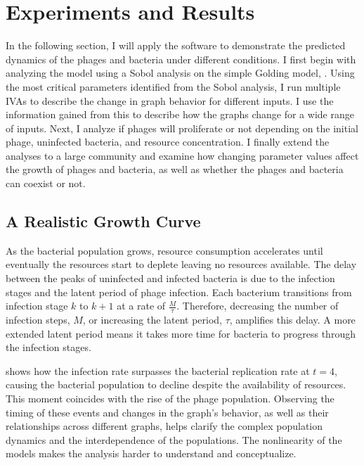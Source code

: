 \chapter{Experiments and Results}
\label{AER}

In the following section, I will apply the software to demonstrate the predicted dynamics of the phages and bacteria under different conditions. 
I first begin with analyzing the model using a Sobol analysis on the simple Golding model, . 
Using the most critical parameters identified from the Sobol analysis, I run multiple IVAs to describe the change in graph behavior for different inputs. 
I use the information gained from this to describe how the graphs change for a wide range of inputs. 
Next, I analyze if phages will proliferate or not depending on the initial phage, uninfected bacteria, and resource concentration. 
I finally extend the analyses to a large community and examine how changing parameter values affect the growth of phages and bacteria, as well as whether the phages and bacteria can coexist or not. 

\section{A Realistic Growth Curve}
As the bacterial population grows, resource consumption accelerates until eventually the resources start to deplete leaving no resources available. 
The delay between the peaks of uninfected and infected bacteria is due to the infection stages and the latent period of phage infection. 
Each bacterium transitions from infection stage $k$ to $k+1$ at a rate of $\frac{M}{\tau}$. 
Therefore, decreasing the number of infection steps, $M$, or increasing the latent period, $\tau$, amplifies this delay. 
A more extended latent period means it takes more time for bacteria to progress through the infection stages.

 shows how the infection rate surpasses the bacterial replication rate at $t=4$, causing the bacterial population to decline despite the availability of resources. 
This moment coincides with the rise of the phage population. 
Observing the timing of these events and changes in the graph's behavior, as well as their relationships across different graphs, helps clarify the complex population dynamics and the interdependence of the populations. 
The nonlinearity of the models makes the analysis harder to understand and conceptualize. 

